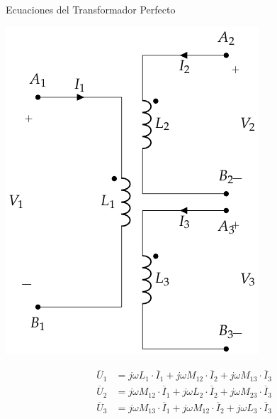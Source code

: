 \documentclass[xcolor={usenames,svgnames,dvipsnames}]{beamer}
\begin{document}
\begin{frame}[label={sec:org69ec244}]{Ecuaciones del Transformador Perfecto}
\begin{center}
\includegraphics[height=0.6\textheight]{../figs/TrafoPerfectoVariosDevanados.pdf}
\end{center}

\begin{align*}
  \overline{U}_1 &= j \omega L_1 \cdot \overline{I}_1 + j \omega M_{12} \cdot\overline{I}_2 + j \omega M_{13} \cdot\overline{I}_3\\
  \overline{U}_2 &= j \omega M_{12} \cdot \overline{I}_1 + j \omega L_2 \cdot \overline{I}_2 + j \omega M_{23} \cdot \overline{I}_3\\
  \overline{U}_3 &= j \omega M_{13} \cdot \overline{I}_1 + j \omega M_{12} \cdot\overline{I}_2 + j \omega L_3 \cdot \overline{I}_3
\end{align*}
\end{frame}
\end{document}

